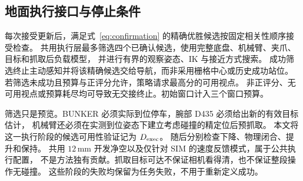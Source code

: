 \subsection{地面执行接口与停止条件}
\label{sec:execution}
每次接受更新后，满足式~\eqref{eq:confirmation} 的精确优胜候选按固定相关性顺序接受检查。
共用执行层最多筛选四个已确认候选，使用完整底盘、机械臂、夹爪、目标和抓取后负载模型，
并进行有界的观察姿态、IK 与接近方式搜索。
成功筛选终止主动感知并将该精确候选交给导航，而非采用栅格中心或历史成功站位。
若筛选未成功且预算与正评分允许，策略请求最高分的可用视点。
非正评分、无可用视点或预算耗尽均可导致无交接终止。初始窗口计入三个窗口预算。

筛选只是预览。BUNKER 必须实际到位停车，腕部 D435 必须给出新的有效目标估计，
机械臂还必须在实测到位姿态下建立考虑碰撞的精定位后预抓取。
本文将这一执行阶段的候选可用性验证记为 $D_{\mathrm{exec}}$。
随后分别检查下降、物理闭合、提升和保持。
共用 $12\,\mathrm{mm}$ 开发净空以及仅针对 SIM 的速度反馈模式，属于公共执行配置，
不是方法独有贡献。抓取目标可达不保证相机看得清，也不保证整段操作无碰撞。
这些阶段的失败均保留为任务失败，不用于重新定义成功。
